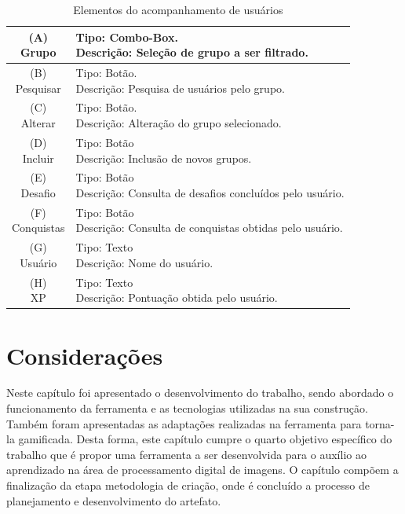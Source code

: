\documentclass[
	12pt,				%
	oneside,			%
	a4paper,			%
	english,			%
	french,				%
	spanish,			%
	brazil,				%
	]{abntex2}
\begin{document}
\begin{longtable}{|c|l|}
 \caption{Elementos do acompanhamento de usuários} \label{tab:visnodeUsuarios} \\
  \hline
  \makecell{(A) \\ Grupo} 
  &
  \makecell[l]{Tipo: Combo-Box.\\ Descrição: Seleção de grupo a ser filtrado.} \\
  \hline
  \makecell{(B) \\ Pesquisar} 
  &
  \makecell[l]{Tipo: Botão.\\ Descrição: Pesquisa de usuários pelo grupo.} \\
  \hline
  \makecell{(C) \\ Alterar} 
  &
  \makecell[l]{Tipo: Botão. \\ Descrição: Alteração do grupo selecionado.} \\
  \hline
  \makecell{(D) \\ Incluir} 
  &
  \makecell[l]{Tipo: Botão\\ Descrição: Inclusão de novos grupos.} \\
  \hline
  \makecell{(E) \\ Desafio} 
  &
  \makecell[l]{Tipo: Botão\\ Descrição: Consulta de desafios concluídos pelo usuário.} \\
  \hline  
  \makecell{(F) \\ Conquistas} 
  &
  \makecell[l]{Tipo: Botão\\ Descrição: Consulta de conquistas obtidas pelo usuário.} \\
  \hline    
  \makecell{(G) \\ Usuário} 
  &
  \makecell[l]{Tipo: Texto\\ Descrição: Nome do usuário.} \\
  \hline    
  \makecell{(H) \\ XP} 
  &
  \makecell[l]{Tipo: Texto\\ Descrição: Pontuação obtida pelo usuário.} \\
  \hline       
\end{longtable}



\section{Considerações}

Neste capítulo foi apresentado o desenvolvimento do trabalho, sendo abordado o funcionamento da ferramenta e as tecnologias utilizadas na sua construção. Também foram apresentadas as adaptações realizadas na ferramenta para torna-la gamificada. Desta forma, este capítulo cumpre o quarto objetivo específico do trabalho que é propor uma ferramenta a ser desenvolvida para o auxílio ao aprendizado na área de processamento digital de imagens. O capítulo compõem a finalização da etapa metodologia de criação, onde é concluído a processo de planejamento e desenvolvimento do artefato.
\end{document}
